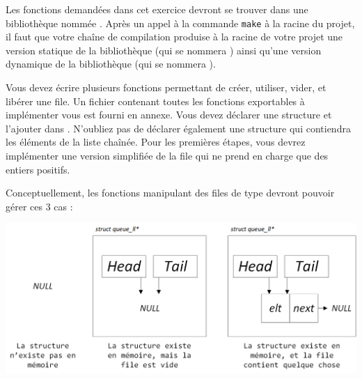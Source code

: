

\vspace*{0.7cm}

\noindent {}

\bigskip

\noindent Les fonctions demandées dans cet exercice devront se trouver dans une bibliothèque nommée .
Après un appel à la commande \texttt{make} à la racine du projet, il faut que votre chaîne de compilation produise à la racine de votre projet une version statique de la bibliothèque (qui se nommera ) ainsi qu'une version dynamique de la bibliothèque (qui se nommera ).

\bigskip

\noindent Vous devez écrire plusieurs fonctions permettant de créer, utiliser, vider, et libérer une file.
Un fichier  contenant toutes les fonctions exportables à implémenter vous est fourni en annexe.
Vous devez déclarer une structure  et l'ajouter dans .
N'oubliez pas de déclarer également une structure qui contiendra les éléments de la liste chaînée.
Pour les premières étapes, vous devrez implémenter une version simplifiée de la file qui ne prend en charge que des entiers positifs.

\bigskip

\noindent Conceptuellement, les fonctions manipulant des files de type  devront pouvoir gérer ces 3 cas :

\bigskip

\begin{center}
\includegraphics[scale=0.85]{Cours/Files_Implementation_LL.png}
\end{center}

